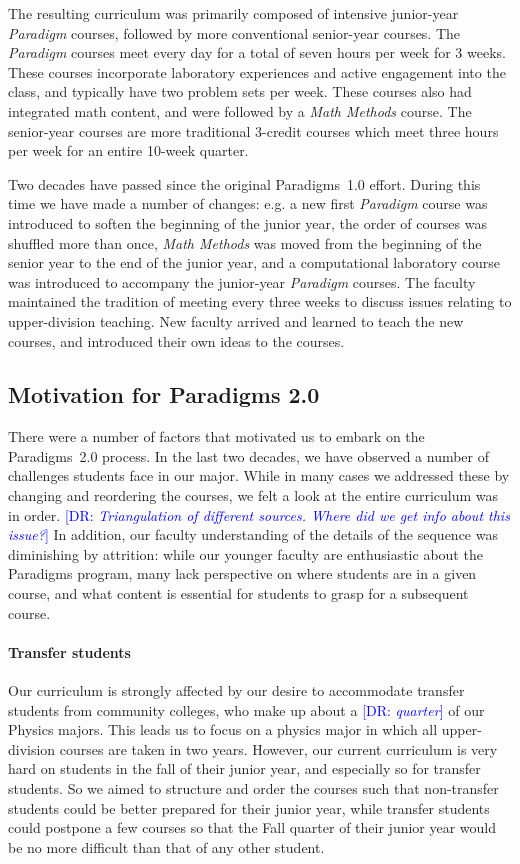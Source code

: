 \documentclass[english,aps,pra,reprint,noshowpacs,superscriptaddress]{revtex4-1}
\newcommand\davidsays[1]{\textcolor{blue}{[\sc DR: {\em#1}]}}
\begin{document}
The resulting curriculum was primarily composed of intensive junior-year \emph{Paradigm}
courses, followed by more conventional senior-year courses.
The \emph{Paradigm} courses meet every day for a total of seven
hours per week for 3 weeks.  These courses incorporate
laboratory experiences and active engagement into the class, and
typically have two problem sets per week.  These courses also had
integrated math content, and were followed by a \emph{Math Methods} course.
The senior-year courses are more traditional 3-credit courses which meet
three hours per week for an entire 10-week quarter.

Two decades have passed since the original Paradigms~1.0 effort.
During this time we have made a number of changes: e.g. a new
first \emph{Paradigm} course was introduced to soften the beginning of the
junior year, the order of courses was shuffled more than once, \emph{Math
Methods} was moved from the beginning of the senior year to the end of
the junior year, and a computational laboratory course was introduced
to accompany the junior-year \emph{Paradigm} courses.  The faculty maintained the tradition of meeting
every three weeks to discuss issues relating to upper-division
teaching.  New faculty arrived and learned to teach the new courses,
and introduced their own ideas to the courses.

\subsection{Motivation for Paradigms 2.0}
There were a number of factors that motivated us to embark on the
Paradigms~2.0 process.  In the last two decades, we have observed
a number of challenges students face in our major.  While in many cases we
addressed these by changing and reordering the courses, we felt a look
at the entire curriculum was in order.  \davidsays{Triangulation of different sources.  Where did we get info about this issue?}
In addition, our faculty
understanding of the details of the sequence was diminishing by attrition: 
while our younger
faculty are enthusiastic about the Paradigms program, many lack perspective on
where students are in a given course, and what content is essential
for students to grasp for a subsequent course.

\paragraph{Transfer students}
Our curriculum is strongly affected by our desire to accommodate
transfer students from community colleges, who make up about a \davidsays{quarter}
of our Physics majors.  This leads us to focus on
a physics major in which all upper-division courses are taken in two
years.  However, our current curriculum is very hard on students in
the fall of their junior year, and especially so for transfer
students.  So we aimed to structure and order the courses such that non-transfer
students could be better prepared for their junior year, while
transfer students could postpone a few courses so that the
Fall quarter of their junior year would be no more difficult than that of any other student.
\end{document}
